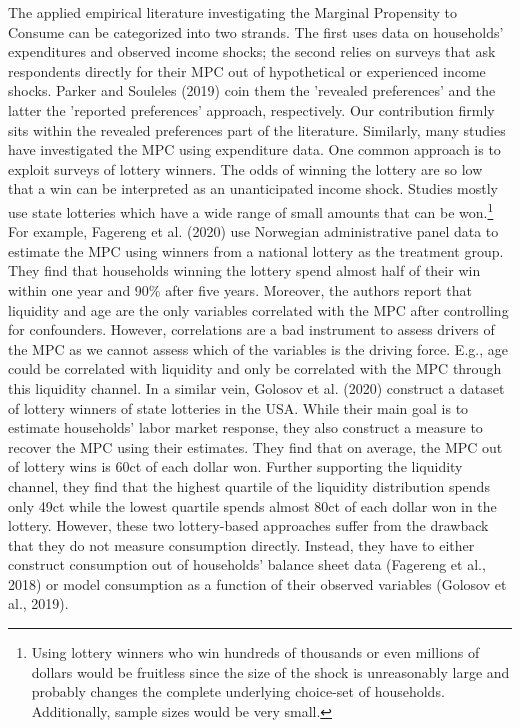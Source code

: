 The applied empirical literature investigating the Marginal Propensity to Consume can be categorized into two strands. The first uses data on households' expenditures and observed income shocks; the second relies on surveys that ask respondents directly for their MPC out of hypothetical or experienced income shocks. Parker and Souleles (2019) coin them the 'revealed preferences' and the latter the 'reported preferences' approach, respectively. Our contribution firmly sits within the revealed preferences part of the literature. Similarly, many studies have investigated the MPC using expenditure data. One common approach is to exploit surveys of lottery winners. The odds of winning the lottery are so low that a win can be interpreted as an unanticipated income shock. Studies mostly use state lotteries which have a wide range of small amounts that can be won.\footnote{Using lottery winners who win hundreds of thousands or even millions of dollars would be fruitless since the size of the shock is unreasonably large and probably changes the complete underlying choice-set of households. Additionally, sample sizes would be very small.} For example, Fagereng et al. (2020) use Norwegian administrative panel data to estimate the MPC using winners from a national lottery as the treatment group. They find that households winning the lottery spend almost half of their win within one year and 90\% after five years. Moreover, the authors report that liquidity and age are the only variables correlated with the MPC after controlling for confounders. However, correlations are a bad instrument to assess drivers of the MPC as we cannot assess which of the variables is the driving force. E.g., age could be correlated with liquidity and only be correlated with the MPC through this liquidity channel. In a similar vein, Golosov et al. (2020) construct a dataset of lottery winners of state lotteries in the USA. While their main goal is to estimate households' labor market response, they also construct a measure to recover the MPC using their estimates. They find that on average, the MPC out of lottery wins is 60ct of each dollar won. Further supporting the liquidity channel, they find that the highest quartile of the liquidity distribution spends only 49ct while the lowest quartile spends almost 80ct of each dollar won in the lottery. However, these two lottery-based approaches suffer from the drawback that they do not measure consumption directly. Instead, they have to either construct consumption out of households' balance sheet data (Fagereng et al., 2018) or model consumption as a function of their observed variables (Golosov et al., 2019). \\
